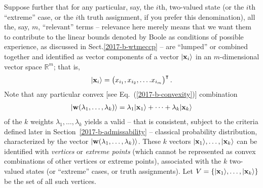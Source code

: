 Suppose further that for any particular, say, the $i$th, two-valued state
(or the $i$th ``extreme'' case, or the $i$th truth assignment, if you prefer this denomination),
all the, say, $m$, ``relevant'' terms
--
relevance here merely means that we want them to contribute to the linear bounds
denoted by Boole as conditions of possible experience, as discussed in Sect.\ref{2017-b-wtmeccp} -- are ``lumped'' or combined together
and identified as vector components of a vector $\vert {\bf x}_i\rangle $
in an $m$-dimensional vector space $\mathbb{R}^m$; that is,
\begin{equation}
\begin{split}
\vert {\bf x}_i\rangle
=
\begin{pmatrix}
x_{i_1},
x_{i_2},
\ldots .
x_{i_m}
\end{pmatrix}^\intercal
.
\label{2017-b-vivector}
\end{split}
\end{equation}
Note that any particular convex [see Eq.~(\ref{2017-b-convexity})] combination
\begin{equation}
\begin{split}
\vert {\bf w} ( \lambda_1 ,\ldots , \lambda_k ) \rangle
=
\lambda_1 \vert  {\bf x}_1 \rangle  + \cdots + \lambda_k \vert  {\bf x}_k \rangle
\label{2017-b-cow}
\end{split}
\end{equation}
of the $k$ weights $\lambda_1, \ldots ,\lambda_k$
yields a valid -- that is consistent, subject to the criteria defined later in Section~\ref{2017-b-admissability} --
classical probability distribution, characterized by the vector $\vert {\bf w} ( \lambda_1 ,\ldots , \lambda_k ) \rangle  $.
These $k$ vectors
$\vert  {\bf x}_1 \rangle , \ldots , \vert  {\bf x}_k \rangle$
can be identified with
{\em vertices} or {\em extreme points}
(which cannot be represented as convex combinations of other vertices  or   extreme points),
 associated with the $k$ two-valued states  (or ``extreme'' cases, or truth assignments).
Let
$
V
=
\left\{
\vert  {\bf x}_1 \rangle , \ldots , \vert  {\bf x}_k \rangle
\right\}
$
be the set of all such vertices.

